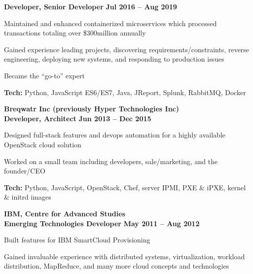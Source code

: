 \documentclass[margin,line]{resume}
\begin{document}
\begin{resume}
    \hspace{2.6mm}\textbf{Developer, Senior Developer} \hfill \textbf{Jul 2016 -- Aug 2019}\vspace{1mm}
    \begin{list2}
        \item Maintained and enhanced containerized microservices which processed transactions totaling over \$300million annually
        \vspace{1mm}
        \item Gained experience leading projects, discovering requirements/constraints, reverse engineering, deploying new systems, and responding to production issues
        \vspace{1mm}
        \item Became the “go-to” expert
        \vspace{1mm}
        \item\textbf{Tech:} Python, JavaScript ES6/ES7, Java, JReport, Splunk, RabbitMQ, Docker
    \end{list2}

    \hspace{-3mm}\textbf{\listing Breqwatr Inc (previously Hyper Technologies Inc)} \vspace{2mm}\\\vspace{1mm}
    \hspace{1.2mm}\textbf{Developer, Architect} \hfill \textbf{Jun 2013 -- Dec 2015}\vspace{1mm}
    \begin{list2}
        \item Designed full-stack features and devops automation for a highly available OpenStack cloud solution
        \vspace{1mm}
        \item Worked on a small team including developers, sale/marketing, and the founder/CEO
        \vspace{1mm}
        \item\textbf{Tech:} Python, JavaScript, OpenStack, Chef, server IPMI, PXE \& iPXE, kernel \& initrd images
    \end{list2}

    \hspace{-3mm}\textbf{\listing IBM, Centre for Advanced Studies}\vspace{2mm}\\\vspace{1mm}
    \hspace{1.2mm}\textbf{Emerging Technologies Developer} \hfill \textbf{May 2011 -- Aug 2012}\vspace{1mm}
    \begin{list2}
        \item Built features for IBM SmartCloud Provisioning
        \vspace{1mm}
        \item Gained invaluable experience with distributed systems, virtualization, workload distribution, MapReduce, and many more cloud concepts and technologies
        \vspace{1mm}
    \end{list2}


\end{resume}
\end{document}
